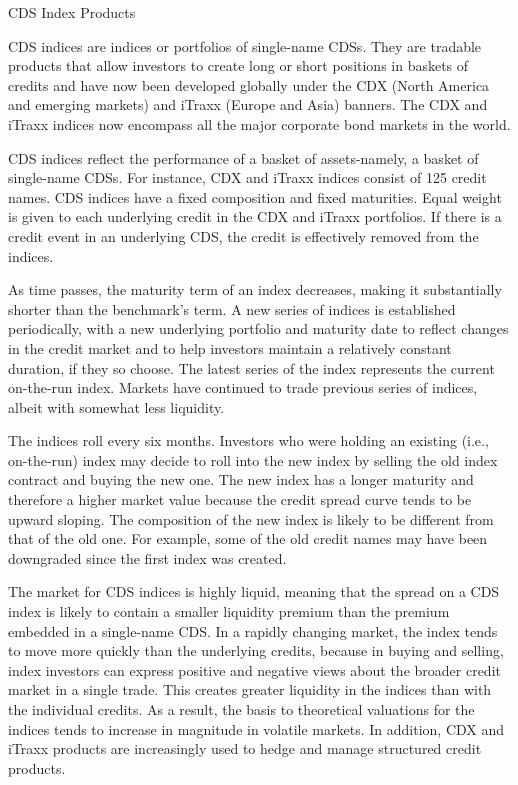 \documentclass[11pt]{article}
\begin{document}
CDS Index Products

CDS indices are indices or portfolios of single-name CDSs. They are tradable products that allow investors to create long or short positions in baskets of credits and have now been developed globally under the CDX (North America and emerging markets) and iTraxx (Europe and Asia) banners. The CDX and iTraxx indices now encompass all the major corporate bond markets in the world.

CDS indices reflect the performance of a basket of assets-namely, a basket of single-name CDSs. For instance, CDX and iTraxx indices consist of 125 credit names. CDS indices have a fixed composition and fixed maturities. Equal weight is given to each underlying credit in the CDX and iTraxx portfolios. If there is a credit event in an underlying CDS, the credit is effectively removed from the indices.

As time passes, the maturity term of an index decreases, making it substantially shorter than the benchmark's term. A new series of indices is established periodically, with a new underlying portfolio and maturity date to reflect changes in the credit market and to help investors maintain a relatively constant duration, if they so choose. The latest series of the index represents the current on-the-run index. Markets have continued to trade previous series of indices, albeit with somewhat less liquidity.

The indices roll every six months. Investors who were holding an existing (i.e., on-the-run) index may decide to roll into the new index by selling the old index contract and buying the new one. The new index has a longer maturity and therefore a higher market value because the credit spread curve tends to be upward sloping. The composition of the new index is likely to be different from that of the old one. For example, some of the old credit names may have been downgraded since the first index was created.

The market for CDS indices is highly liquid, meaning that the spread on a CDS index is likely to contain a smaller liquidity premium than the premium embedded in a single-name CDS. In a rapidly changing market, the index tends to move more quickly than the underlying credits, because in buying and selling, index investors can express positive and negative views about the broader credit market in a single trade. This creates greater liquidity in the indices than with the individual credits. As a result, the basis to theoretical valuations for the indices tends to increase in magnitude in volatile markets. In addition, CDX and iTraxx products are increasingly used to hedge and manage structured credit products.
\end{document}
